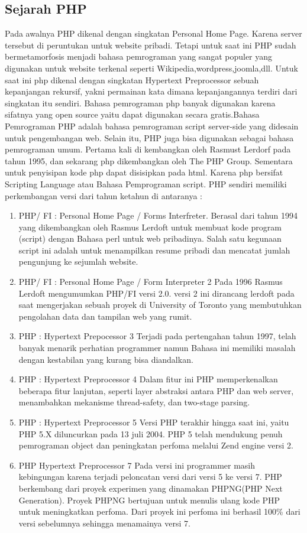 \subsection{Sejarah PHP}
Pada awalnya PHP dikenal dengan singkatan Personal Home Page. Karena server tersebut di peruntukan untuk website pribadi. Tetapi untuk saat ini PHP sudah bermetamorfosis menjadi bahasa pemrograman yang sangat populer yang digunakan untuk website terkenal seperti Wikipedia,wordpress,joomla,dll.
Untuk saat ini php dikenal dengan singkatan Hypertext Preprocessor sebuah kepanjangan rekursif, yakni permainan kata dimana kepanjangannya terdiri dari singkatan itu sendiri. Bahasa pemrograman php banyak digunakan karena sifatnya yang open source yaitu dapat digunakan secara gratis.Bahasa Pemrograman PHP adalah bahasa pemrograman script server-side yang didesain untuk pengembangan web. Selain itu, PHP juga bisa digunakan sebagai bahasa pemrograman umum. Pertama kali di kembangkan oleh Rasmust Lerdorf pada tahun 1995, dan sekarang php dikembangkan oleh The PHP Group.
Sementara untuk penyisipan kode php dapat disisipkan pada html. Karena php bersifat Scripting Language atau Bahasa Pemprograman script. PHP sendiri memiliki perkembangan versi dari tahun ketahun di antaranya :
  \begin{enumerate}
     \item PHP/ FI : Personal Home Page / Forms Interfreter.
      Berasal dari tahun 1994 yang dikembangkan oleh Rasmus Lerdoft untuk membuat kode program (script) dengan Bahasa perl untuk web pribadinya. Salah satu kegunaan script ini adalah untuk menampilkan resume pribadi dan mencatat jumlah pengunjung ke sejumlah website.
     \item PHP/ FI : Personal Home Page / Form Interpreter 2
      Pada 1996 Rasmus Lerdoft mengumumkan PHP/FI versi 2.0. versi 2 ini dirancang lerdoft pada saat mengerjakan sebuah proyek di University of Toronto yang membutuhkan pengolahan data dan tampilan web yang rumit.
     \item PHP : Hypertext Prepocessor 3
      Terjadi pada pertengahan tahun 1997, telah banyak menarik perhatian programmer namun Bahasa ini memiliki masalah dengan kestabilan yang kurang bisa diandalkan.
     \item PHP : Hypertext Preprocessor 4
      Dalam fitur ini PHP memperkenalkan beberapa fitur lanjutan, seperti layer abstraksi antara PHP dan web server, menambahkan mekanisme thread-safety, dan two-stage parsing.
    \item PHP : Hypertext Preprocessor 5
      Versi PHP terakhir hingga saat ini, yaitu PHP 5.X diluncurkan pada 13 juli 2004. PHP 5 telah mendukung penuh pemrograman object dan peningkatan perfoma melalui Zend engine versi 2.
    \item PHP Hypertext Preprocessor 7
      Pada versi ini programmer masih kebingungan karena terjadi peloncatan versi dari versi 5 ke versi 7. PHP berkembang dari proyek experimen yang dinamakan PHPNG(PHP Next Generation). Proyek PHPNG bertujuan untuk menulis ulang kode PHP untuk meningkatkan perfoma. Dari proyek ini perfoma ini berhasil 100\% dari versi sebelumnya sehingga menamainya versi 7.
 \end{enumerate}
